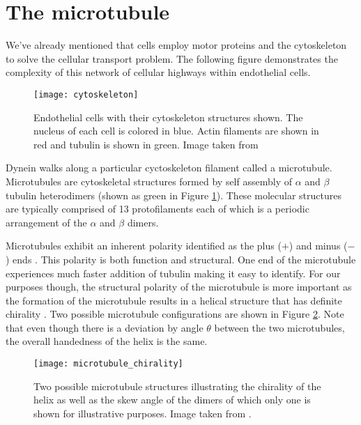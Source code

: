\section{The microtubule}
We've already mentioned that cells employ motor proteins and the cytoskeleton to solve the cellular transport problem. The following figure demonstrates the complexity of this network of cellular highways within endothelial cells. 
\begin{figure}[!hbt]
	\centering
	\texttt{[image: cytoskeleton]}
	\caption{Endothelial cells with their cytoskeleton structures shown. The nucleus of each cell is colored in blue. Actin filaments are shown in red and tubulin is shown in green. Image taken from \cite{cytoskeleton}}
	\label{fig:cytoskeleton}
\end{figure}

Dynein walks along a particular cyctoskeleton filament called a microtubule. Microtubules are cytoskeletal structures formed by self assembly of $\alpha$ and $\beta$ tubulin heterodimers (shown as green in Figure \ref{fig:cytoskeleton}). \cite{downing_tubulin_1998} These molecular structures are typically comprised of 13 protofilaments each of which is a periodic arrangement of the $\alpha$ and $\beta$ dimers. 

Microtubules exhibit an inherent polarity identified as the plus ($+$) and minus ($-$) ends \cite{lodish_microtubule_2000}. This polarity is both function and structural. One end of the microtubule experiences much faster addition of tubulin making it easy to identify\cite{heidemann_visualization_1980}. For our purposes though, the structural polarity of the microtubule is more important as the formation of the microtubule results in a helical structure that has definite chirality \cite{microtubule_chirality}. Two possible microtubule configurations are shown in Figure \ref{fig:chirality}. Note that even though there is a deviation by angle $\theta$ between the two microtubules, the overall handedness of the helix is the same. 

\begin{figure}[!hbt]
	\centering 
	\texttt{[image: microtubule\_chirality]}
	\caption{Two possible microtubule structures illustrating the chirality of the helix as well as the skew angle of the dimers of which only one is shown for illustrative purposes. Image taken from \cite{microtubule_chirality}.}
	\label{fig:chirality}
\end{figure}


